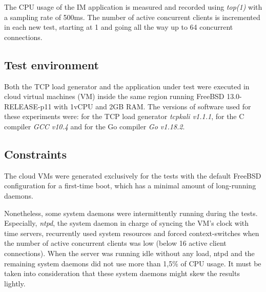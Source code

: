 The CPU usage of the IM application is measured and recorded using \textit{top(1)} with a sampling rate of 500ms. The number of active concurrent clients is incremented in each new test, starting at 1 and going all the way up to 64 concurrent connections.

\subsection{Test environment}
Both the TCP load generator and the application under test were executed in cloud virtual machines (VM) inside the same region running FreeBSD 13.0-RELEASE-p11 with 1vCPU and 2GB RAM. The versions of software used for these experiments were: for the TCP load generator \textit{tcpkali v1.1.1}, for the C compiler \textit{GCC v10.4} and for the Go compiler \textit{Go v1.18.2}.

\subsection{Constraints}
The cloud VMs were generated exclusively for the tests with the default FreeBSD configuration for a first-time boot, which has a minimal amount of long-running daemons.

Nonetheless, some system daemons were intermittently running during the tests. Especially, \textit{ntpd}, the system daemon in charge of syncing the VM's clock with time servers, recurrently used system resources and forced context-switches when the number of active concurrent clients was low (below 16 active client connections). When the server was running idle without any load, ntpd and the remaining system daemons did not use more than 1,5\% of CPU usage. It must be taken into consideration that these system daemons might skew the results lightly.

